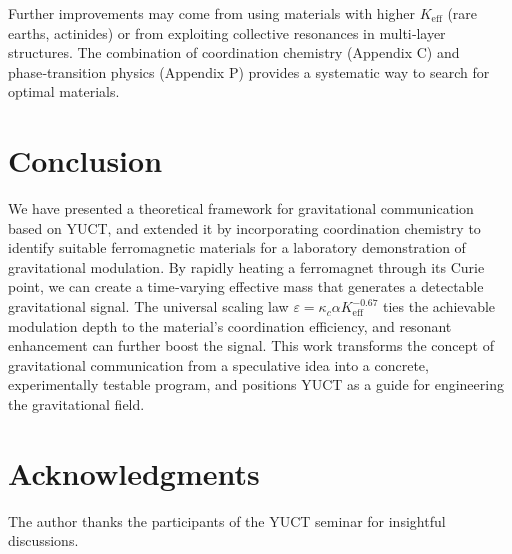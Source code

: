 \documentclass[12pt,a4paper]{article}
\newcommand{\Keff}{K_{\mathrm{eff}}}
\newcommand{\kappac}{\kappa_c}
\newcommand{\eps}{\varepsilon}
\begin{document}
	Further improvements may come from using materials with higher \(\Keff\) (rare earths, actinides) or from exploiting collective resonances in multi‑layer structures. The combination of coordination chemistry (Appendix C) and phase‑transition physics (Appendix P) provides a systematic way to search for optimal materials.
	
	\section{Conclusion}
	\label{sec:conclusion}
	
	We have presented a theoretical framework for gravitational communication based on YUCT, and extended it by incorporating coordination chemistry to identify suitable ferromagnetic materials for a laboratory demonstration of gravitational modulation. By rapidly heating a ferromagnet through its Curie point, we can create a time‑varying effective mass that generates a detectable gravitational signal. The universal scaling law \(\eps = \kappac\alpha\Keff^{-0.67}\) ties the achievable modulation depth to the material's coordination efficiency, and resonant enhancement can further boost the signal. This work transforms the concept of gravitational communication from a speculative idea into a concrete, experimentally testable program, and positions YUCT as a guide for engineering the gravitational field.
	
	\section*{Acknowledgments}
	
	The author thanks the participants of the YUCT seminar for insightful discussions.
	
\end{document}
